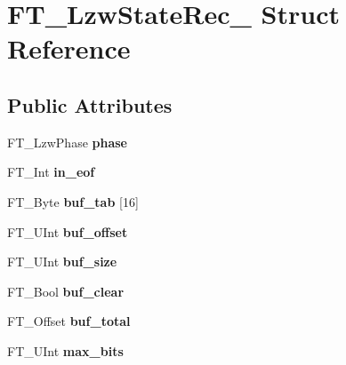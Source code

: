 \hypertarget{struct_f_t___lzw_state_rec__}{}\section{F\+T\+\_\+\+Lzw\+State\+Rec\+\_\+ Struct Reference}
\label{struct_f_t___lzw_state_rec__}
\subsection*{Public Attributes}
\begin{DoxyCompactItemize}
\item 
\mbox{\label{struct_f_t___lzw_state_rec___a35e3822c3bd5fd64f575d17b66f653be}} 
F\+T\+\_\+\+Lzw\+Phase {\bfseries phase}
\item 
\mbox{\label{struct_f_t___lzw_state_rec___a7e9f42aaec77c4629129d2f06ca7cc35}} 
F\+T\+\_\+\+Int {\bfseries in\+\_\+eof}
\item 
\mbox{\label{struct_f_t___lzw_state_rec___a8babbb6feb2d3e53cbf3259cfced1d69}} 
F\+T\+\_\+\+Byte {\bfseries buf\+\_\+tab} \mbox{[}16\mbox{]}
\item 
\mbox{\label{struct_f_t___lzw_state_rec___a383f245c92d43dab15cb133dfb6b72fb}} 
F\+T\+\_\+\+U\+Int {\bfseries buf\+\_\+offset}
\item 
\mbox{\label{struct_f_t___lzw_state_rec___a46b0115335b9e989f94eaf29a4b86fed}} 
F\+T\+\_\+\+U\+Int {\bfseries buf\+\_\+size}
\item 
\mbox{\label{struct_f_t___lzw_state_rec___ac775dec247e97d7b11eb2570d94f6a60}} 
F\+T\+\_\+\+Bool {\bfseries buf\+\_\+clear}
\item 
\mbox{\label{struct_f_t___lzw_state_rec___a5903a4e2858a0b03b2fd5479aace3e4f}} 
F\+T\+\_\+\+Offset {\bfseries buf\+\_\+total}
\item 
\mbox{\label{struct_f_t___lzw_state_rec___a0d78b2dfa9324612b520a00f08fd7316}} 
F\+T\+\_\+\+U\+Int {\bfseries max\+\_\+bits}

\end{DoxyCompactItemize}
